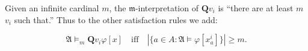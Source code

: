 Given an infinite cardinal $m$, the $\mathfrak{m}$-interpretation of $\mathbf{Q}v_i$ is ``there are at least $m$ $v_i$ such that.'' Thus to the other satisfaction rules we add:

$$\mathfrak{A} \models_{m} \mathbf{Q}v_i\varphi[x] \quad \text{iff} \quad |\{a \in A : \mathfrak{A} \models \varphi[x_a^i]\}| \geq m.$$
